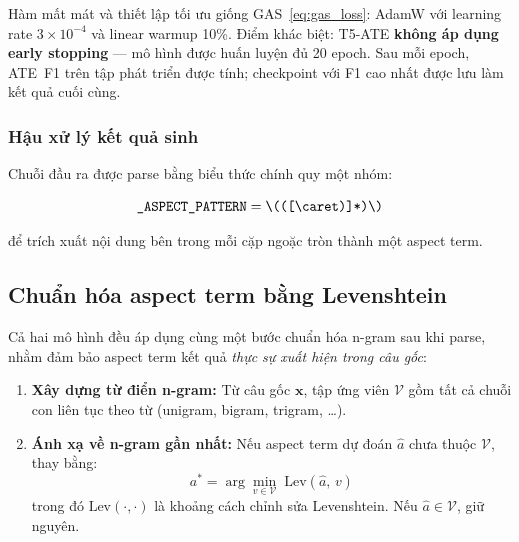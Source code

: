 Hàm mất mát và thiết lập tối ưu giống GAS~\eqref{eq:gas_loss}:
AdamW với learning rate $3 \times 10^{-4}$ và linear warmup 10\%.
Điểm khác biệt: T5-ATE \textbf{không áp dụng early stopping} — mô
hình được huấn luyện đủ 20 epoch.  Sau mỗi epoch, ATE~F1 trên tập
phát triển được tính; checkpoint với F1 cao nhất được lưu làm kết quả
cuối cùng.

\subsubsection{Hậu xử lý kết quả sinh}
\label{subsubsec:t5ate_postprocess}

Chuỗi đầu ra được parse bằng biểu thức chính quy một nhóm:

\begin{equation}
  \texttt{\_ASPECT\_PATTERN} =
    \texttt{\textbackslash(([{\caret})]*)\textbackslash)}
  \label{eq:ate_regex}
\end{equation}

\noindent để trích xuất nội dung bên trong mỗi cặp ngoặc tròn thành
một aspect term.

\subsection{Chuẩn hóa aspect term bằng Levenshtein}
\label{subsubsec:levenshtein}

Cả hai mô hình đều áp dụng cùng một bước chuẩn hóa n-gram sau khi
parse, nhằm đảm bảo aspect term kết quả \textit{thực sự xuất hiện
trong câu gốc}:

\begin{enumerate}
  \item \textbf{Xây dựng từ điển n-gram:}  Từ câu gốc $\mathbf{x}$,
    tập ứng viên $\mathcal{V}$ gồm tất cả chuỗi con liên tục theo từ
    (unigram, bigram, trigram, \dots).

  \item \textbf{Ánh xạ về n-gram gần nhất:}  Nếu aspect term dự đoán
    $\hat{a}$ chưa thuộc $\mathcal{V}$, thay bằng:
    \begin{equation}
      a^* = \arg\min_{v \in \mathcal{V}}\;
        \mathrm{Lev}(\hat{a},\, v)
      \label{eq:levenshtein}
    \end{equation}
    \noindent trong đó $\mathrm{Lev}(\cdot, \cdot)$ là khoảng cách
    chỉnh sửa Levenshtein.  Nếu $\hat{a} \in \mathcal{V}$, giữ
    nguyên.
\end{enumerate}


